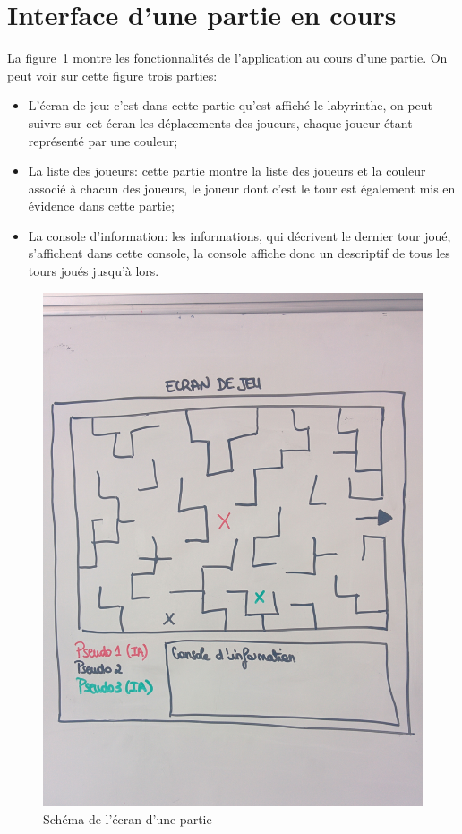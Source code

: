 \section{Interface d'une partie en cours}
	La figure~\ref{fig:ecran_partie} montre les fonctionnalités de l'application au cours d'une partie. On peut voir sur cette figure trois parties:
	\begin{itemize}
		\item L'écran de jeu: c'est dans cette partie qu'est affiché le labyrinthe, on peut suivre sur cet écran les déplacements des joueurs, chaque joueur étant représenté par une couleur;
		\item La liste des joueurs: cette partie montre la liste des joueurs et la couleur associé à chacun des joueurs, le joueur dont c'est le tour est également mis en évidence dans cette partie;
		\item La console d'information: les informations, qui décrivent le dernier tour joué, s'affichent dans cette console, la console affiche donc un descriptif de tous les tours joués jusqu'à lors.
	\end{itemize}
	\begin{figure}[h]
		\centering
		\includegraphics[scale=0.2]{images/schema_ecran_partie.jpg}
		\caption{Schéma de l'écran d'une partie}
		\label{fig:ecran_partie}
	\end{figure}

